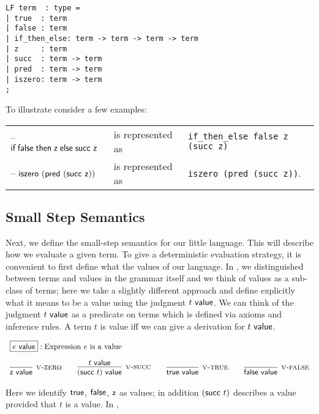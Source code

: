 \begin{lstlisting}
LF term  : type =
| true  : term
| false : term
| if_then_else: term -> term -> term -> term
| z     : term
| succ  : term -> term
| pred  : term -> term
| iszero: term -> term
;
\end{lstlisting}

To illustrate consider a few examples:

\begin{tabular}{lll}
-- $\textsf{if\;} \textsf{false} \textsf{\;then\;} \textsf{z} \textsf{\;else\;} \textsf{succ}~\textsf{z}$ & is represented as  &
\lstinline!if_then_else false z (succ z)!\\
-- $\textsf{iszero}~(\textsf{pred}~(\textsf{succ}~\textsf{z}))$ & is represented as & \lstinline!iszero (pred (succ z))!.
\end{tabular}




\subsection{Small Step Semantics}
Next, we define the small-step semantics for our little language. This
will describe how we evaluate a given term. To give a deterministic
evaluation strategy, it is convenient to first define what the values
of our language. In \cite{TAPL}, we distinguished between terms and values in the
grammar itself and we think of values as a sub-class of terms; here we take a slightly
different approach and define explicitly what it means to be a value 
using the judgment $t ~\textsf{value}$. We can think of the judgment $t ~\textsf{value}$ as a
predicate on terms which is defined via axioms and inference rules. A
term $t$ is value iff we can give a derivation for $t ~\textsf{value}$.

\[
\begin{array}{c}
\multicolumn{1}{l}{\fbox{$e \isv$}: \mbox{Expression $e$ is a value}}\\[1em]
\infer[\Vzero]{\tmzero \isv}{} \qquad \infer[\Vsuc]{(\tmsucc t) \isv}{t \isv}
\qquad \infer[\Vtrue]{\tmtrue \isv}{}
\qquad \infer[\Vfalse]{\tmfalse \isv}{}
\end{array}
\]

Here we identify $\textsf{true}$, $\textsf{false}$, $\textsf{z}$ as values; in
addition $(\textsf{succ}~t)$ describes a value provided that $t$ is
a value. In \cite{TAPL}, 

